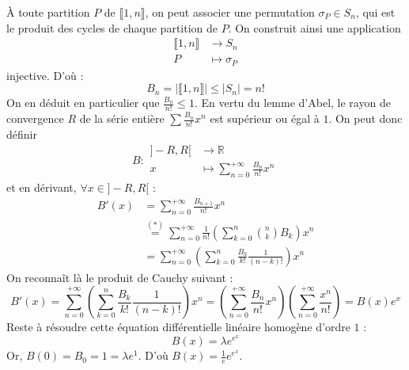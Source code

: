 \begin{demonstration}
		À toute partition $P$ de $\llbracket 1, n \rrbracket$, on peut associer une permutation $\sigma_P \in S_n$, qui est le produit des cycles de chaque partition de $P$. On construit ainsi une application
		\[
		\begin{array}{cl}
			\llbracket 1, n \rrbracket &\rightarrow S_n \\
			P &\mapsto \sigma_P
		\end{array}
		\]
		injective. D'où :
		\[ B_n = |\llbracket 1, n \rrbracket| \leq |S_n| = n! \]
		On en déduit en particulier que $\frac{B_n}{n!} \leq 1$. En vertu du lemme d'Abel, le rayon de convergence $R$ de la série entière $\sum \frac{B_n}{n!} x^n$ est supérieur ou égal à $1$. On peut donc définir
		\[
		B :
		\begin{array}{cl}
			]-R,R[ &\rightarrow \mathbb{R} \\
			x &\mapsto \sum_{n=0}^{+\infty} \frac{B_n}{n!} x^n
		\end{array}
		\]
		et en dérivant, $\forall x \in ]-R,R[$ :
		\begin{align*}
			B'(x) &= \sum_{n=0}^{+\infty} \frac{B_{n+1}}{n!} x^n \\
			&\overset{(*)}{=} \sum_{n=0}^{+\infty} \frac{1}{n!} \left( \sum_{k=0}^n \binom{n}{k} B_k \right) x^n \\
			&= \sum_{n=0}^{+\infty} \left( \sum_{k=0}^n \frac{B_k}{k!} \frac{1}{(n-k)!} \right) x^n
		\end{align*}
		On reconnaît là le produit de Cauchy suivant :
		\[ B'(x) = \sum_{n=0}^{+\infty} \left( \sum_{k=0}^n \frac{B_k}{k!} \frac{1}{(n-k)!} \right) x^n = \left( \sum_{n=0}^{+\infty} \frac{B_n}{n!} x^n \right) \left( \sum_{n=0}^{+\infty} \frac{x^n}{n!} \right) = B(x) e^x \]
		Reste à résoudre cette équation différentielle linéaire homogène d'ordre $1$ :
		\[ B(x) = \lambda e^{e^x} \]
		Or, $B(0) = B_0 = 1 = \lambda e^1$. D'où $B(x) = \frac{1}{e} e^{e^x}$.
		

\end{demonstration}
